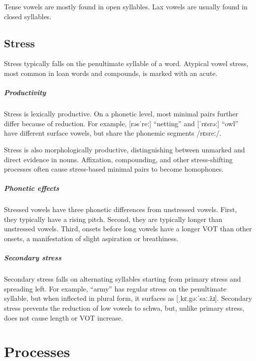 Tense vowels are mostly found in open syllables. Lax vowels are usually found in closed syllables.

\section{Stress}
 Stress typically falls on the penultimate syllable of a word. Atypical vowel stress, most common in loan words and compounds, is marked with an acute. 

\paragraph{Productivity} Stress is lexically productive. On a phonetic level, most minimal pairs further differ because of reduction. For example,  [rəsˈreː] “netting” and  [ˈrɛsrəː] “owl” have different surface vowels, but share the phonemic segments /rɛsreː/.

Stress is also morphologically productive, distinguishing between unmarked and direct evidence in nouns. Affixation, compounding, and other stress-shifting processes often cause stress-based minimal pairs to become homophones.

\paragraph{Phonetic effects} Stressed vowels have three phonetic differences from unstressed vowels. First, they typically have a rising pitch. Second, they are typically longer than unstressed vowels. Third, onsets before long vowels have a longer VOT than other onsets, a manifestation of slight aspiration or breathiness.

\paragraph{Secondary stress} Secondary stress falls on alternating syllables starting from primary stress and spreading left. For example,  “army” has regular stress on the penultimate syllable, but when inflected in plural form, it surfaces as  [ˌkɛ.gəːˈsaː.z̃ɹ]. Secondary stress prevents the reduction of low vowels to schwa, but, unlike primary stress, does not cause length or VOT increase.

\setchapterpreamble[u]{\margintoc}
\chapter{Processes}
